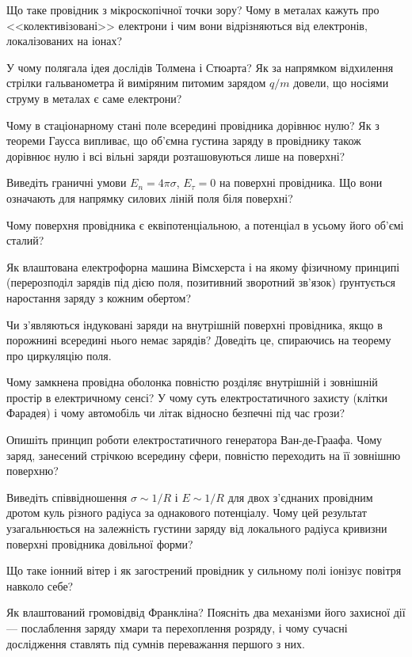 \begin{Questions}
\begin{quizlist}
	\item Що таке провідник з мікроскопічної точки зору? Чому в металах кажуть про <<колективізовані>> електрони і чим вони відрізняються від електронів, локалізованих на іонах?
	\item У чому полягала ідея дослідів Толмена і Стюарта? Як за напрямком відхилення стрілки гальванометра й виміряним питомим зарядом $q/m$ довели, що носіями струму в металах є саме електрони?
	\item Чому в стаціонарному стані поле всередині провідника дорівнює нулю? Як з теореми Гаусса випливає, що об'ємна густина заряду в провіднику також дорівнює нулю і всі вільні заряди розташовуються лише на поверхні?
	\item Виведіть граничні умови $E_n = 4\pi\sigma$, $E_\tau = 0$ на поверхні провідника. Що вони означають для напрямку силових ліній поля біля поверхні?
	\item Чому поверхня провідника є еквіпотенціальною, а потенціал в усьому його об'ємі сталий?
	\item Як влаштована електрофорна машина Вімсхерста і на якому фізичному принципі (перерозподіл зарядів під дією поля, позитивний зворотний зв'язок) ґрунтується наростання заряду з кожним обертом?
	\item Чи з'являються індуковані заряди на внутрішній поверхні провідника, якщо в порожнині всередині нього немає зарядів? Доведіть це, спираючись на теорему про циркуляцію поля.
	\item Чому замкнена провідна оболонка повністю розділяє внутрішній і зовнішній простір в електричному сенсі? У чому суть електростатичного захисту (клітки Фарадея) і чому автомобіль чи літак відносно безпечні під час грози?
	\item Опишіть принцип роботи електростатичного генератора Ван-де-Граафа. Чому заряд, занесений стрічкою всередину сфери, повністю переходить на її зовнішню поверхню?
	\item Виведіть співвідношення $\sigma \sim 1/R$ і $E\sim1/R$ для двох з'єднаних провідним дротом куль різного радіуса за однакового потенціалу. Чому цей результат узагальнюється на залежність густини заряду від локального радіуса кривизни поверхні провідника довільної форми?
	\item Що таке іонний вітер і як загострений провідник у сильному полі іонізує повітря навколо себе?
	\item Як влаштований громовідвід Франкліна? Поясніть два механізми його захисної дії --- послаблення заряду хмари та перехоплення розряду, і чому сучасні дослідження ставлять під сумнів переважання першого з них.

\end{quizlist}
\end{Questions}
